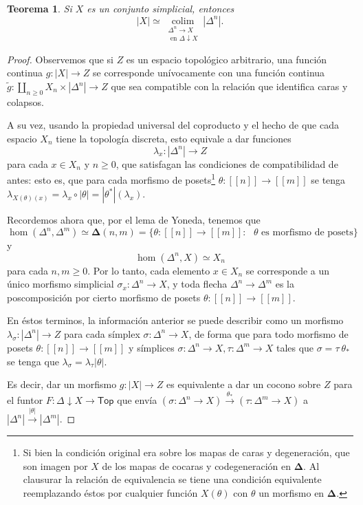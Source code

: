 \documentclass[11pt]{report}
\theoremstyle{colored}
\newtheorem{theorem}{Teorema}[section]
\newcommand{\nat}[1]{[\![#1]\!]}
\newcommand{\ord}[1]{\nat{#1}}
\renewcommand{\ss}[1]{\Delta^{#1}}
\newcommand{\ordcat}{\boldsymbol{\Delta}}
\newcommand{\catcolim}[2]{\underset{#1}{\operatorname{colim}}#2}
\begin{document}
\begin{theorem} Si $X$ es un conjunto simplicial, entonces
\[
|X| \simeq \catcolim{\substack{\ss{n} \to X \\ \text{ en $\Delta \downarrow X$}}}{|\ss{n}|}.
\]
\end{theorem}
\begin{proof} Observemos que si $Z$ es un espacio topológico arbitrario, una función continua $g : |X| \to Z$ se corresponde unívocamente con una función continua $\tilde{g} : \coprod_{n \geq 0} X_n \times |\ss{n}| \to Z$ que sea compatible con la relación que identifica caras y colapsos.

A su vez, usando la propiedad universal del coproducto y el hecho de que cada espacio $X_n$ tiene la topología discreta, esto equivale a dar funciones
\[
\lambda_x : |\ss{n}| \to Z
\]
para cada $x \in X_n$ y $n \geq 0$, que satisfagan las condiciones de compatibilidad de antes: esto es, que para cada morfismo de posets\footnote{Si bien la condición original era sobre los mapas de caras y degeneración, que son imagen por $X$ de los mapas de cocaras y codegeneración en $\ordcat$. Al clausurar la relación de equivalencia se tiene una condición equivalente reemplazando éstos por cualquier función $X(\theta)$ con $\theta$ un morfismo en $\ordcat$.} $\theta : \ord{n} \to \ord{m}$ se tenga $\lambda_{X(\theta)(x)} = \lambda_x \circ |\theta| = |\theta^*|(\lambda_x)$.

Recordemos ahora que, por el lema de Yoneda, tenemos que
\[
\hom(\ss{n},\ss{m}) \simeq \ordcat(n,m) = \{\theta : \ord{n} \to \ord{m} : \text{ $\theta$ es morfismo de posets}\}
\]
y
\[
\hom(\ss{n}, X) \simeq X_n
\]
para cada $n,m \geq 0$. Por lo tanto, cada elemento $x \in X_n$ se corresponde a un único morfismo simplicial $\sigma_x : \ss{n} \to X$, y toda flecha $\ss{n} \to \ss{m}$ es la poscomposición por cierto morfismo de posets $\theta: \ord{n} \to \ord{m}$.

En éstos terminos, la información anterior se puede describir como un morfismo $\lambda_\sigma : |\ss{n}| \to Z$ para cada símplex $\sigma : \ss{n} \to X$, de forma que para todo morfismo de posets $\theta : \ord{n} \to \ord{m}$ y símplices $\sigma : \ss{n} \to X, \tau : \ss{m} \to X$ tales que $\sigma = \tau \  \theta_*$ se tenga que $\lambda_\sigma = \lambda_\tau |\theta|$. 

Es decir, dar un morfismo $g : |X| \to Z$ es equivalente a dar un cocono sobre $Z$ para el funtor $F : \Delta \downarrow X \to \mathsf{Top}$ que envía $(\sigma : \ss{n} \to X) \xrightarrow{\theta_*} (\tau : \ss{m} \to X)$ a $|\ss{n}| \xrightarrow{|\theta|} |\ss{m}|$.


\end{proof}
\end{document}
